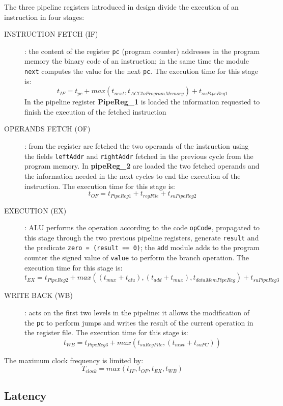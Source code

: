 The three pipeline registers introduced in design divide the execution of an instruction in four stages:
\begin{description}
    \item[INSTRUCTION FETCH (IF)]: the content of the register {\tt pc} (program counter) addresses in the program memory the binary code of an instruction; in the same time the module {\tt next} computes the value for the next {\tt pc}. The execution time for this stage is:
        $$t_{IF} = t_{pc} + max(t_{next}, t_{ACCto Program Memory}) + t_{suPipeReg1}$$
        In the pipeline register {\bf PipeReg\_1} is loaded the information requested to finish the execution of the fetched instruction
        
    \item[OPERANDS FETCH (OF)]: from the register are fetched the two operands of the instruction using the fields {\tt leftAddr} and {\tt rightAddr} fetched in the previous cycle from the program memory. In {\bf pipeReg\_2} are loaded the two fetched operands and the information needed in the next cycles to end the execution of the instruction. The execution time for this stage is:
        $$t_{OF} = t_{PipeReg1} + t_{regFile} + t_{suPipeReg2}$$


        
    \item[EXECUTION (EX)]: ALU performs the operation according to the code {\tt opCode}, propagated to this stage through the two previous  pipeline registers,  generate {\tt result} and the predicate {\tt zero = (result == 0)}; the {\tt add} module adds to the program counter the signed value of {\tt value} to perform the branch operation.  The execution time for this stage is:
        $$t_{EX} = t_{PipeReg2} + max((t_{mux}+t_{alu}),  (t_{add}+t_{mux}), t_{dataMemPipeReg}) + t_{suPipeReg3}$$
    \item[WRITE BACK (WB)]: acts on the first two levels in the pipeline: it allows the modification of the {\tt pc} to perform jumps and writes the result of the current operation in the register file. The execution time for this stage is:
        $$t_{WB} = t_{PipeReg3} +  max(t_{suRegFile}, (t_{next} + t_{suPC}))$$
\end{description}
The maximum clock frequency is limited by:
$$T_{clock} = max(t_{IF}, t_{OF}, t_{EX}, t_{WB})$$



\subsection{Latency}

